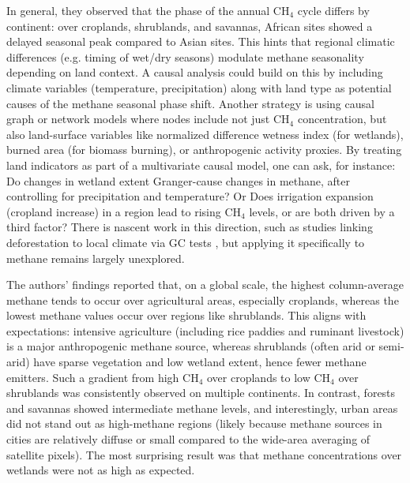 In general, they observed that the phase of the annual CH$_4$ cycle differs by continent: over croplands, shrublands, and savannas, African sites showed a delayed seasonal peak compared to Asian sites. This hints that regional climatic differences (e.g. timing of wet/dry seasons) modulate methane seasonality depending on land context. A causal analysis could build on this by including climate variables (temperature, precipitation) along with land type as potential causes of the methane seasonal phase shift. Another strategy is using causal graph or network models where nodes include not just CH$_4$ concentration, but also land-surface variables like normalized difference wetness index (for wetlands), burned area (for biomass burning), or anthropogenic activity proxies. By treating land indicators as part of a multivariate causal model, one can ask, for instance: Do changes in wetland extent Granger-cause changes in methane, after controlling for precipitation and temperature? Or Does irrigation expansion (cropland increase) in a region lead to rising CH$_4$ levels, or are both driven by a third factor? There is nascent work in this direction, such as studies linking deforestation to local climate via GC tests \cite{Kovacs2023}, but applying it specifically to methane remains largely unexplored.

The authors' findings reported that, on a global scale, the highest column-average methane tends to occur over agricultural areas, especially croplands, whereas the lowest methane values occur over regions like shrublands. This aligns with expectations: intensive agriculture (including rice paddies and ruminant livestock) is a major anthropogenic methane source, whereas shrublands (often arid or semi-arid) have sparse vegetation and low wetland extent, hence fewer methane emitters. Such a gradient from high CH$_4$ over croplands to low CH$_4$ over shrublands was consistently observed on multiple continents. In contrast, forests and savannas showed intermediate methane levels, and interestingly, urban areas did not stand out as high-methane regions (likely because methane sources in cities are relatively diffuse or small compared to the wide-area averaging of satellite pixels). The most surprising result was that methane concentrations over wetlands were not as high as expected. 

